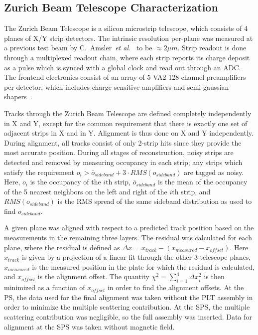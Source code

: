 \documentclass[journal]{IEEEtran}
\begin{document}
%
%
 \subsection{Zurich Beam Telescope Characterization}

The Zurich Beam Telescope is a silicon microstrip telescope, which consists of 4 planes of X/Y strip detectors.  The intrinsic resolution per-plane was measured at a previous test beam by C.~Amsler~\emph{et al.}~\cite{zurich-telescope} to be $\approx 2 \mu m$.   Strip readout is done through a multiplexed readout chain, where each strip reports its charge deposit as a pulse which is synced with a global clock and read out through an ADC.  The frontend electronics consist of an array of 5 VA2 128 channel preamplifiers per detector, which includes charge sensitive amplifiers and semi-gaussian shapers~\cite{zurich-telescope}.

Tracks through the Zurich Beam Telescope are defined completely independently in X and Y, except for the common requirement that there is exactly one set of adjacent strips in X and in Y.  Alignment is thus done on X and Y independently.  During alignment, all tracks consist of only 2-strip hits since they provide the most accurate position.  During all stages of reconstruction,  noisy strips are detected and removed by measuring occupancy in each strip; any strips which satisfy the requirement $o_i >  \bar{o}_{sideband} + 3\cdot RMS(o_{sideband})$ are tagged as noisy.  Here, $o_i$ is the occupancy of the $i$th strip, $\bar{o}_{sideband}$ is the mean of the occupancy of the 5 nearest neighbors on the left and right of the $i$th strip, and $RMS(o_{sideband})$ is the RMS spread of the same sideband distribution as used to find $o_{sideband}$.

A given plane was aligned with respect to a predicted track position based on the measurements in the remaining three layers.  The residual was calculated for each plane, where the residual is defined as $\Delta x = x_{track} - (x_{measured} - x_{offset})$.  Here $x_{track}$ is given by a projection of a  linear fit through the other 3 telescope planes, $x_{measured}$ is the measured position in the plate for which the residual is calculated, and $x_{offset}$ is the alignment offset.  The quantity $\chi^2 = \sum_{i=1}^4 \Delta x_i^2$ is then minimized as a function of $x_{offset}$ in order to find the alignment offsets.  At the PS, the data used for the final alignment was taken without the PLT assembly in order to minimize the multiple scattering contribution.  At the SPS, the multiple scattering contribution was negligible, so the full assembly was inserted. Data for alignment at the SPS was taken without magnetic field.
\end{document}
